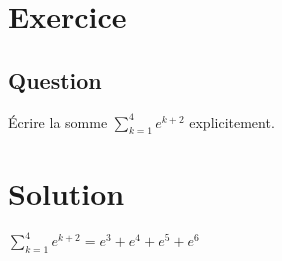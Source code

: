 \documentclass{article}
\begin{document}
\section{Exercice}

\subsection*{Question}
Écrire la somme $ \displaystyle{\sum_{k= 1 }^{ 4 }} e^{k + 2} $ explicitement.

\section{Solution}
$ \displaystyle{\sum_{k= 1 }^{ 4 }} e^{k + 2} = e^3 + e^4 + e^5 + e^6 $
\end{document}
